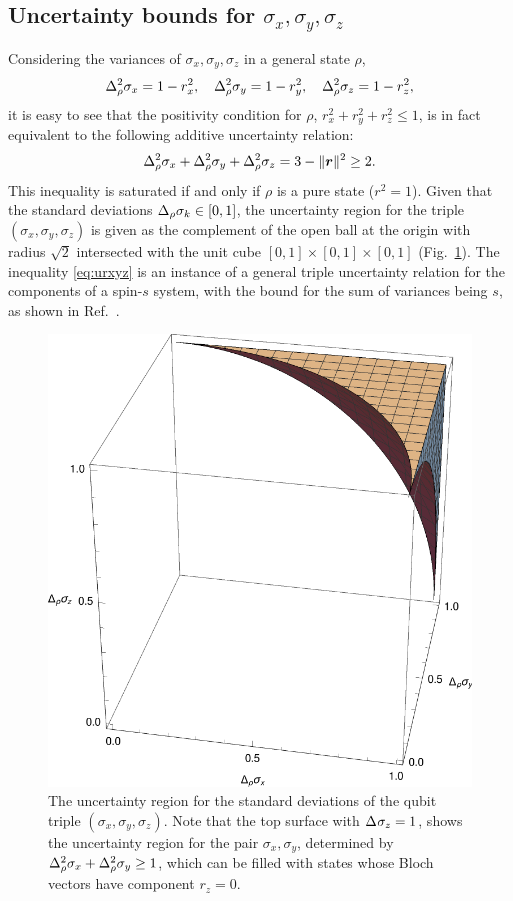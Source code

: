 \subsection{Uncertainty bounds for $\sigma_x,\sigma_y,\sigma_z$}\label{sec:xyz}
Considering the variances of $\sigma_x,\sigma_y,\sigma_z$ in a general state $\rho$,
\begin{equation}
  \varr{\sigma_x}=1-r_x^2,\quad \varr{\sigma_y}=1-r_y^2,  \quad \varr{\sigma_z}=1-r_z^2,
\end{equation}
it is easy to see that the positivity condition for $\rho$, $r_x^2+r_y^2+r_z^2\le 1$, is in fact equivalent to the following additive uncertainty relation:
\begin{align}\label{eq:urxyz}
  \varr{\sigma_x}+\varr{\sigma_y}+\varr{\sigma_z}=3-\|\bor\|^2\ge 2.
\end{align}
This inequality is saturated if and only if $\rho$ is a pure state ($r^2=1$).
Given that the standard deviations $\sdevr{\sigma_k}\in[0,1]$, the uncertainty region for the triple $(\sigma_x,\sigma_y,\sigma_z)$ is given as the complement of the open ball at the origin with radius $\sqrt{2}$ intersected with the unit cube $[0,1]\times[0,1]\times[0,1]$ (Fig.~\ref{fig:orth-triple}). The inequality \eqref{eq:urxyz} is an instance of a general triple uncertainty relation for the components of a spin-$s$ system, with the bound for the sum of variances being $s$, as shown in Ref.~\cite{HofmannTakeuchi2003}.

\begin{figure}[ht]\centering
  \includegraphics[width=.5\textwidth]{figs/qubit-triple}
  \caption[The uncertainty region for the standard deviations of the qubit triple $(\sigma_x,\sigma_y,\sigma_z)$]{The uncertainty region for the standard deviations of the qubit triple $(\sigma_x,\sigma_y,\sigma_z)$. Note that the top surface with $\sdev{\sigma_z}=1$, shows the uncertainty region for the pair $\sigma_x,\sigma_y$, determined by
    $\varr{\sigma_x}+\varr{\sigma_y}\ge 1$, which can be filled with states whose Bloch vectors have component $r_z=0$.}
  \label{fig:orth-triple}
\end{figure}



